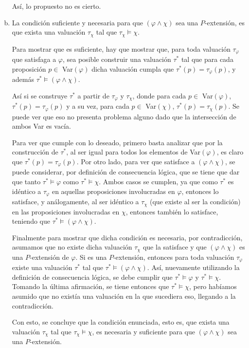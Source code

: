 \documentclass[letterpaper,10pt]{article}
\begin{document}
\begin{enumerate}[a)]
    Así, lo propuesto no es cierto.

    \item La condición suficiente y necesaria para que $(\varphi \wedge \chi)$ sea una $P$-extensión, es que exista una valuación $\tau_\chi$ tal que $\tau_\chi \models \chi$.

    Para mostrar que es suficiente, hay que mostrar que, para toda valuación $\tau_\varphi$ que satisfaga a $\varphi$, sea posible construir una valuación $\tau^*$ tal que para cada proposición $p \in$ Var$(\varphi)$ dicha valuación cumpla que $\tau^*(p) = \tau_\varphi(p)$, y además $\tau^* \models (\varphi \wedge \chi)$.

    Así si se construye $\tau^*$ a partir de $\tau_\varphi$ y $\tau_\chi$, donde para cada $p \in$ Var$(\varphi)$, $\tau^*(p) = \tau_\varphi(p)$ y a su vez, para cada $p \in$ Var$(\chi)$, $\tau^*(p) = \tau_\chi(p)$. Se puede ver que eso no presenta problema alguno dado que la intersección de ambos Var es vacía.

    Para ver que cumple con lo deseado, primero basta analizar que por la construcción de $\tau^*$, al ser igual para todos los elementos de Var$(\varphi)$, es claro que $\tau^*(p) = \tau_\varphi(p)$. Por otro lado, para ver que satisface a $(\varphi \wedge \chi)$, se puede considerar, por definición de consecuencia lógica, que se tiene que dar que tanto $\tau^* \models \varphi$ como $\tau^* \models \chi$. Ambos casos se cumplen, ya que como $\tau^*$ es idéntico a $\tau_\varphi$ en aquellas proposiciones involucradas en $\varphi$, entonces lo satisface, y análogamente, al ser idéntico a $\tau_\chi$ (que existe al ser la condición) en las proposiciones involucradas en $\chi$, entonces también lo satisface, teniendo que $\tau^* \models (\varphi \wedge \chi)$.

    Finalmente para mostrar que dicha condición es necesaria, por contradicción, asumamos que no existe dicha valuación $\tau_\chi$ que la satisface y que $(\varphi \wedge \chi)$ es una $P$-extensión de $\varphi$. Si es una $P$-extensión, entonces para toda valuación $\tau_\varphi$ existe una valuación $\tau^*$ tal que $\tau^* \models (\varphi \wedge \chi)$. Así, nuevamente utilizando la definición de consecuencia lógica, se debe cumplir que $\tau^* \models \varphi$ y $\tau^* \models \chi$. Tomando la última afirmación, se tiene entonces que $\tau^* \models \chi$, pero habíamos asumido que no existía una valuación en la que sucediera eso, llegando a la contradicción.

    Con esto, se concluye que la condición enunciada, esto es, que exista una valuación $\tau_\chi$ tal que $\tau_\chi \models \chi$, es necesaria y suficiente para que $(\varphi \wedge \chi)$ sea una $P$-extensión.

\end{enumerate}
\end{document}
